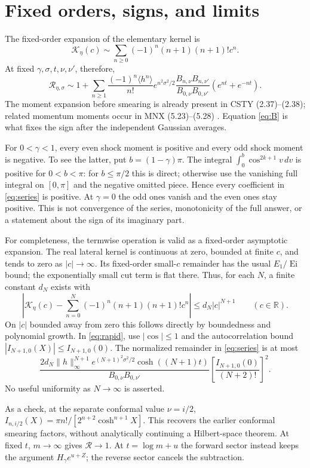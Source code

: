\documentclass[11pt,a4paper]{article}
\newcommand{\K}{\mathcal K}
\newcommand{\R}{\mathcal R}
\begin{document}
\newpage
\section{Fixed orders, signs, and limits}
The fixed-order expansion of the elementary kernel is
\[
 \K_\eta(c)\sim\sum_{n\geq0}(-1)^n(n+1)(n+1)!c^n.
\]
At fixed $\gamma,\sigma,t,\nu,\nu'$, therefore,
\begin{equation}
 \R_{\eta,\sigma}\sim1+\sum_{n\geq1}
 \frac{(-1)^n\langle h^n\rangle}{n!}
 e^{n^2\sigma^2/2}
 \frac{B_{n,\nu}B_{n,\nu'}}{B_{0,\nu}B_{0,\nu'}}
 (e^{nt}+e^{-nt}).\label{eq:series}
\end{equation}
The moment expansion before smearing is already present in CSTY
(2.37)--(2.38); related momentum moments occur in MNX (5.23)--(5.28)
\cite{mnx}. Equation \eqref{eq:B} is what fixes the sign after the
independent Gaussian averages.

For $0<\gamma<1$, every even shock moment is positive and every odd
shock moment is negative. To see the latter, put $b=(1-\gamma)\pi$.
The integral $\int_0^b\cos^{2k+1}v\,dv$ is positive for $0<b<\pi$:
for $b\leq\pi/2$ this is direct; otherwise use the vanishing full
integral on $[0,\pi]$ and the negative omitted piece. Hence every
coefficient in \eqref{eq:series} is positive. At $\gamma=0$ the odd
ones vanish and the even ones stay positive. This is not convergence
of the series, monotonicity of the full answer, or a statement about
the sign of its imaginary part.

For completeness, the termwise operation is valid as a fixed-order
asymptotic expansion. The real lateral kernel is continuous at zero,
bounded at finite $c$, and tends to zero as $|c|\to\infty$.
Its fixed-order small-$c$ remainder has the usual $E_1/\operatorname{Ei}$
bound; the exponentially small cut term is flat there. Thus, for
each $N$, a finite constant $d_N$ exists with
\[
 \left|\K_\eta(c)-\sum_{n=0}^{N}(-1)^n(n+1)(n+1)!c^n\right|
 \leq d_N|c|^{N+1}\qquad(c\in\mathbb R).
\]
On $|c|$ bounded away from zero this follows directly by boundedness
and polynomial growth. In \eqref{eq:rapid}, use $|\cos|\leq1$ and
the autocorrelation bound $|I_{N+1,0}(X)|\leq I_{N+1,0}(0)$.
The normalized remainder in \eqref{eq:series} is at most
\[
 \frac{2d_N\|h\|_\infty^{N+1}e^{(N+1)^2\sigma^2/2}
 \cosh((N+1)t)}{B_{0,\nu}B_{0,\nu'}}
 \left[\frac{I_{N+1,0}(0)}{(N+2)!}\right]^2.
\]
No useful uniformity as $N\to\infty$ is asserted.

As a check, at the separate conformal value $\nu=i/2$,
$I_{n,i/2}(X)=\pi n!/[2^{n+2}\cosh^{n+1}X]$. This recovers the earlier
conformal smearing factors, without analytically continuing a
Hilbert-space theorem. At fixed $t$, $m\to\infty$ gives $\R\to1$.
At $t=\log m+u$ the forward sector instead keeps the argument
$H_\gamma e^{u+Z}$; the reverse sector cancels the subtraction.
\end{document}

